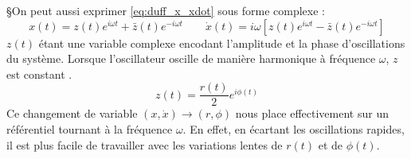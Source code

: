 §On peut aussi exprimer \eqref{eq:duff_x_xdot} sous forme complexe :
\begin{equation}
    x(t) = z(t)e^{i\omega t} + \bar{z}(t) e^{-i\omega t}
    \qquad 
    \dot{x}(t) = i\omega \left[ z(t)e^{i\omega t} - \bar{z}(t) e^{-i\omega t} \right]
    \label{eq:duff_x_xdot_exp}
\end{equation}
%
$z(t)$ étant une variable complexe encodant l'amplitude et la phase d'oscillations du système. Lorsque l'oscillateur oscille de manière harmonique à fréquence $\omega$, $z$ est constant \cite{pistolesi_duffing_nodate}.
\[ z(t) = \frac{r(t)}{2}e^{i\phi(t)} \]
%
Ce changement de variable $(x, \dot{x}) \to (r, \phi)$ nous place effectivement sur un référentiel tournant à la fréquence $\omega$. 
En effet, en écartant les oscillations rapides, il est plus facile de travailler avec les variations lentes de $r(t)$ et de $\phi(t)$. 

